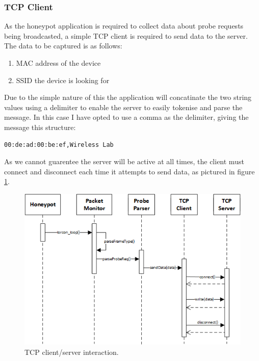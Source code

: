 \subsubsection{TCP Client}
\label{hp-tcp}
As the honeypot application is required to collect data about probe requests being broadcasted, a simple TCP client is required to send data to the server. The data to be captured is as follows:

\begin{enumerate}
\item MAC address of the device
\item SSID the device is looking for
\end{enumerate}

Due to the simple nature of this the application will concatinate the two string values using a delimiter to enable the server to easily tokenise and parse the message. In this case I have opted to use a comma as the delimiter, giving the message this structure:

\begin{verbatim}
00:de:ad:00:be:ef,Wireless Lab
\end{verbatim}

As we cannot guarentee the server will be active at all times, the client must connect and disconnect each time it attempts to send data, as pictured in figure \ref{fig:hp_tcp_server}. 

\begin{figure}[h!]
\centering\includegraphics[width=\linewidth]{design/figures/hp-tcp-client.png}
\caption{TCP client/server interaction.}
\label{fig:hp_tcp_server}
\end{figure}

